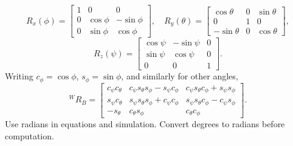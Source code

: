\documentclass[11pt,a4paper]{article}
\begin{document}
\[
R_x(\phi)=\begin{bmatrix}1&0&0\\0&\cos\phi&-\sin\phi\\0&\sin\phi&\cos\phi\end{bmatrix},
\quad
R_y(\theta)=\begin{bmatrix}\cos\theta&0&\sin\theta\\0&1&0\\-\sin\theta&0&\cos\theta\end{bmatrix},
\]
\[
R_z(\psi)=\begin{bmatrix}\cos\psi&-\sin\psi&0\\\sin\psi&\cos\psi&0\\0&0&1\end{bmatrix}.
\]
Writing \(c_\phi=\cos\phi\), \(s_\phi=\sin\phi\), and similarly for other angles,
\[
{}^WR_B=\begin{bmatrix}
c_\psi c_\theta&c_\psi s_\theta s_\phi-s_\psi c_\phi&c_\psi s_\theta c_\phi+s_\psi s_\phi\\
s_\psi c_\theta&s_\psi s_\theta s_\phi+c_\psi c_\phi&s_\psi s_\theta c_\phi-c_\psi s_\phi\\
-s_\theta&c_\theta s_\phi&c_\theta c_\phi
\end{bmatrix}.
\]
Use radians in equations and simulation. Convert degrees to radians before computation.
\end{document}
